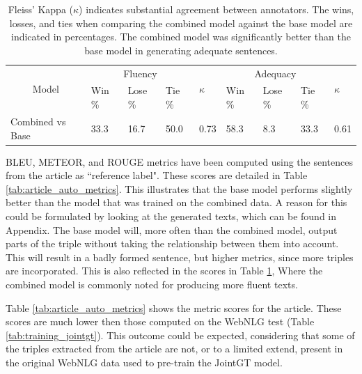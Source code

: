 \documentclass[
hf, %
]{ceurart}
\begin{document}
\begin{table}[ht]
\caption{Fleiss' Kappa ($\kappa$) indicates substantial agreement between annotators. The wins, losses, and ties when comparing the combined model against the base model are indicated in percentages. The combined model was significantly better than the base model in generating adequate sentences.}

\centering
\begin{tabular}{|c|lll|l|lll|l|}
\hline
\multirow{2}{*}{Model}                 & \multicolumn{3}{c|}{Fluency}                                        & \multirow{2}{*}{$\kappa$} & \multicolumn{3}{c|}{Adequacy}                                       & \multirow{2}{*}{$\kappa$} \\ \cline{2-4} \cline{6-8}
                                       & \multicolumn{1}{l|}{Win \%} & \multicolumn{1}{l|}{Lose \%} & Tie \% &                    & \multicolumn{1}{l|}{Win \%} & \multicolumn{1}{l|}{Lose \%} & Tie \% &                    \\ \hline
\multicolumn{1}{|l|}{Combined vs Base} & \multicolumn{1}{l|}{33.3}   & \multicolumn{1}{l|}{16.7}    & 50.0   & 0.73               & \multicolumn{1}{l|}{58.3}   & \multicolumn{1}{l|}{8.3}     & 33.3   & 0.61               \\ \hline
\end{tabular}
\label{tab:article_annotations}
\end{table}

BLEU, METEOR, and ROUGE metrics have been computed using the sentences from the article as ``reference label". These scores are detailed in Table \ref{tab:article_auto_metrics}. This illustrates that the base model performs slightly better than the model that was trained on the combined data. A reason for this could be formulated by looking at the generated texts, which can be found in Appendix. The base model will, more often than the combined model, output parts of the triple without taking the relationship between them into account. This will result in a badly formed sentence, but higher metrics, since more triples are incorporated. This is also reflected in the scores in Table \ref{tab:article_annotations}, Where the combined model is commonly noted for producing more fluent texts.

Table \ref{tab:article_auto_metrics} shows the metric scores for the article. These scores are much lower then those computed on the WebNLG test (Table \ref{tab:training_jointgt}). This outcome could be expected, considering that some of the triples extracted from the article are not, or to a limited extend, present in the original WebNLG data used to pre-train the JointGT model.
\end{document}
